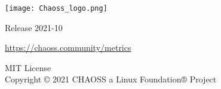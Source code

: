\begin{titlepage}
    \begin{center}
        \vspace*{1.5cm}
            
        \texttt{[image: Chaoss\_logo.png]}
        
	\vspace{2cm}


        \vspace{1cm}
        \Huge
        Release 2021-10
            
        \vspace{1.5cm}
        
	\LARGE
	    \url{https://chaoss.community/metrics}
            
        \vfill
            
        \Large
        MIT License\\
        Copyright © 2021 CHAOSS a Linux Foundation® Project\\
            
    \end{center}
\end{titlepage}

\thispagestyle{empty}
